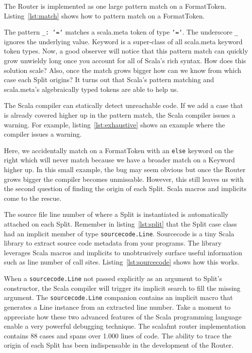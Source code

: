 The Router is implemented as one large pattern match on a FormatToken.
Listing~\ref{lst:match} shows how to pattern match on a FormatToken.

The pattern \texttt{\_: `=`} matches a scala.meta token of type \texttt{`=`}.
The underscore \texttt{\_} ignores the underlying value.
Keyword is a super-class of all scala.meta keyword token types.
Now, a good observer will notice that this pattern match can quickly grow unwieldy long once you account for all of Scala's rich syntax.
How does this solution scale?
Also, once the match grows bigger how can we know from which case each Split origins?
It turns out that Scala's pattern matching and scala.meta's algebraically typed tokens are able to help us.

The Scala compiler can statically detect unreachable code.
If we add a case that is already covered higher up in the pattern match, the Scala compiler issues a warning.
For example, listing~\ref{lst:exhaustive} shows an example where the compiler issues a warning.

Here, we accidentally match on a FormatToken with an \texttt{else} keyword on the right which will never match because we have a broader match on a Keyword higher up.
In this small example, the bug may seem obvious but once the Router grows bigger the compiler becomes unmissable.
However, this still leaves us with the second question of finding the origin of each Split.
Scala macros\autocite{burmako2013scala} and implicits\autocite{oliveira2010type} come to the rescue.

The source file line number of where a Split is instantiated is automatically attached on each Split.
Remember in listing~\ref{lst:split} that the Split case class had an implicit member of type \texttt{sourcecode.Line}.
Sourcecode\autocite{lihao91:online} is a tiny Scala library to extract source code metadata from your programs.
The library leverages Scala macros and implicits to unobtrusively surface useful information such as line number of call sites.
Listing~\ref{lst:sourcecode} shows how this works.

When a \texttt{sourcecode.Line} not passed explicitly as an argument to Split's constructor, the Scala compiler will trigger its implicit search to fill the missing argument.
The \texttt{sourcecode.Line} companion contains an implicit macro that generates a Line instance from an extracted line number.
Take a moment to appreciate how these two advanced features of the Scala programming language enable a very powerful debugging technique.
The scalafmt router implementation contains 88 cases and spans over 1.000 lines of code.
The ability to trace the origin of each Split has been indispensable in the development of the Router.

